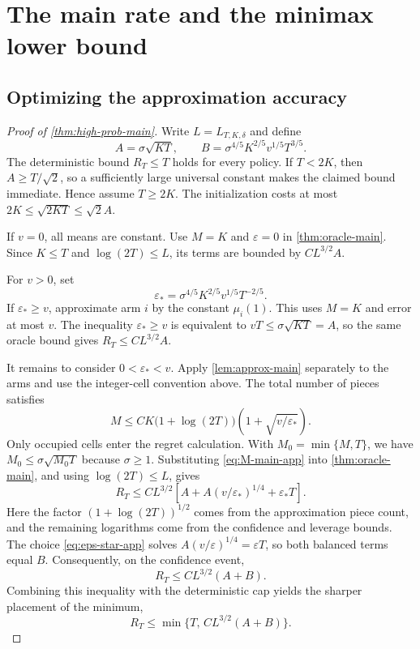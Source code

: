 \documentclass[11pt]{article}
\theoremstyle{remark}
\begin{document}
\section{The main rate and the minimax lower bound}\label{app:main-proof}

\subsection{Optimizing the approximation accuracy}

\begin{proof}[Proof of \cref{thm:high-prob-main}]
Write $L=L_{T,K,\delta}$ and define
\[
A=\sigma\sqrt{KT},
\qquad
B=\sigma^{4/5}K^{2/5}v^{1/5}T^{3/5}.
\]
The deterministic bound $R_T\le T$ holds for every policy.  If $T<2K$,
then $A\ge T/\sqrt2$, so a sufficiently large universal constant makes
the claimed bound immediate.  Hence assume $T\ge2K$.
The initialization costs at most $2K\le\sqrt{2KT}\le\sqrt2 A$.

If $v=0$, all means are constant.  Use $M=K$ and $\varepsilon=0$ in
\cref{thm:oracle-main}.  Since $K\le T$ and
$\log(2T)\le L$, its terms are bounded by $CL^{3/2}A$.

For $v>0$, set
\begin{equation}\label{eq:eps-star-app}
\varepsilon_*=\sigma^{4/5}K^{2/5}v^{1/5}T^{-2/5}.
\end{equation}
If $\varepsilon_*\ge v$, approximate arm $i$ by the constant
$\mu_i(1)$.  This uses $M=K$ and error at most $v$.  The inequality
$\varepsilon_*\ge v$ is equivalent to
$vT\le\sigma\sqrt{KT}=A$, so the same oracle bound gives
$R_T\le CL^{3/2}A$.

It remains to consider $0<\varepsilon_*<v$.
Apply \cref{lem:approx-main} separately to the arms and use the
integer-cell convention above.  The total number of pieces satisfies
\begin{equation}\label{eq:M-main-app}
M\le CK\bigl(1+\log(2T)\bigr)
       \left(1+\sqrt{v/\varepsilon_*}\right).
\end{equation}
Only occupied cells enter the regret calculation.  With
$M_0=\min\{M,T\}$, we have
$M_0\le\sigma\sqrt{M_0T}$ because $\sigma\ge1$.
Substituting \eqref{eq:M-main-app} into \cref{thm:oracle-main}, and
using $\log(2T)\le L$, gives
\begin{equation}\label{eq:prebalance-app}
R_T\le CL^{3/2}
\left[
A+A(v/\varepsilon_*)^{1/4}+\varepsilon_*T
\right].
\end{equation}
Here the factor $(1+\log(2T))^{1/2}$ comes from the approximation
piece count, and the remaining logarithms come from the confidence and
leverage bounds.  The choice \eqref{eq:eps-star-app} solves
$A(v/\varepsilon)^{1/4}=\varepsilon T$, so both balanced terms
equal $B$.  Consequently, on the confidence event,
\[
R_T\le CL^{3/2}(A+B).
\]
Combining this inequality with the deterministic cap yields the sharper
placement of the minimum,
\[
R_T\le \min\{T,\,CL^{3/2}(A+B)\}.
\]
\end{proof}
\end{document}
